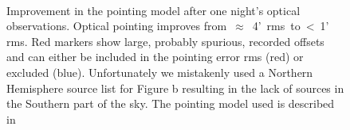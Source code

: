 \begin{figure}[ht]
 \centering
{}
\hspace{0.1cm}
\\
 \caption{Improvement in the pointing model after one night's optical observations. Optical pointing improves from~$\approx$~4'~rms~to~\textless~1' rms. Red markers show large, probably spurious, recorded offsets and can either be included in the pointing error rms (red) or excluded (blue). Unfortunately we mistakenly used a Northern Hemisphere source list for Figure b resulting in the lack of sources in the Southern part of the sky. The pointing model used is described in  }
 \label{fig:opticalPointing}
\end{figure}











\clearpage